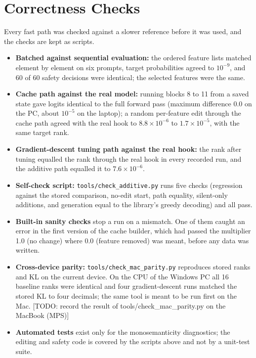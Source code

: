 \documentclass[12pt,a4paper]{report}
\newcommand{\todo}[1]{{\color{red}[TODO: #1]}}
\begin{document}
\section{Correctness Checks}\label{sec:checks}

Every fast path was checked against a slower reference before it was used, and the checks are kept as scripts.

\begin{itemize}
  \item \textbf{Batched against sequential evaluation:} the ordered feature lists matched element by element on six prompts, target probabilities agreed to $10^{-9}$, and 60 of 60 safety decisions were identical; the selected features were the same.
  \item \textbf{Cache path against the real model:} running blocks 8 to 11 from a saved state gave logits identical to the full forward pass (maximum difference 0.0 on the PC, about $10^{-5}$ on the laptop); a random per-feature edit through the cache path agreed with the real hook to $8.8\times10^{-6}$ to $1.7\times10^{-5}$, with the same target rank.
  \item \textbf{Gradient-descent tuning path against the real hook:} the rank after tuning equalled the rank through the real hook in every recorded run, and the additive path equalled it to $7.6\times10^{-6}$.
  \item \textbf{Self-check script:} \texttt{tools/\allowbreak{}check\_\allowbreak{}additive.\allowbreak{}py} runs five checks (regression against the stored comparison, no-edit start, path equality, silent-only additions, and generation equal to the library's greedy decoding) and all pass.
  \item \textbf{Built-in sanity checks} stop a run on a mismatch. One of them caught an error in the first version of the cache builder, which had passed the multiplier 1.0 (no change) where 0.0 (feature removed) was meant, before any data was written.
  \item \textbf{Cross-device parity:} \texttt{tools/\allowbreak{}check\_\allowbreak{}mac\_\allowbreak{}parity.\allowbreak{}py} reproduces stored ranks and KL on the current device. On the CPU of the Windows PC all 16 baseline ranks were identical and four gradient-descent runs matched the stored KL to four decimals; the same tool is meant to be run first on the Mac. \todo{record the result of tools/check\_mac\_parity.py on the MacBook (MPS)}
  \item \textbf{Automated tests} exist only for the monosemanticity diagnostics; the editing and safety code is covered by the scripts above and not by a unit-test suite.
\end{itemize}
\end{document}
